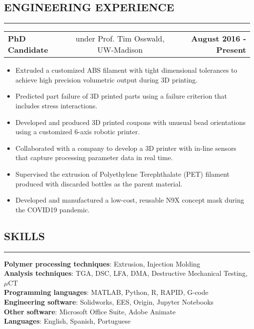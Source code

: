 \documentclass[11pt,letterpaper]{article}
\makeatletter
\newcommand{\headerrow}[3]
{\vspace{0.4em}
\noindent
\begin{tabular*}{\textwidth}{l @{\extracolsep{\fill}} cr}
	\textbf{#1} & %
	#2 &		  %
	\textbf{#3}\\ %
\end{tabular*}}
\makeatother
\begin{document}
\subsection*{ENGINEERING EXPERIENCE}
	\vspace{-0.5em}
	\hrule

	\headerrow
		{PhD Candidate}
		{under Prof. Tim Osswald, UW-Madison}
		{August 2016 - Present}
		
	\begin{itemize}
		\item Extruded a customized ABS filament with tight dimensional tolerances to achieve high precision volumetric output during 3D printing.
		\item Predicted part failure of 3D printed parts using a failure criterion that includes stress interactions.
		\item Developed and produced 3D printed coupons with unusual bead orientations using a customized 6-axis robotic printer.
		\item Collaborated with a company to develop a 3D printer with in-line sensors that capture processing parameter data in real time.
		\item Supervised the extrusion of Polyethylene Terephthalate (PET) filament produced with discarded bottles as the parent material.
		\item Developed and manufactured a low-cost, reusable N9X concept mask during the COVID19 pandemic. 
	\end{itemize}

\subsection*{SKILLS}
\vspace{-0.5em}
\hrule
\vspace{0.4em}

\textbf{Polymer processing techniques}: Extrusion, Injection Molding\\
\textbf{Analysis techniques}: TGA, DSC, LFA, DMA, Destructive Mechanical Testing, $\mu$CT\\
\textbf{Programming languages}: MATLAB, Python, R, RAPID, G-code\\
\textbf{Engineering software}: Solidworks, EES, Origin, Jupyter Notebooks\\
\textbf{Other software}: Microsoft Office Suite, Adobe Animate\\
\textbf{Languages}: English, Spanish, Portuguese\\
\end{document}

